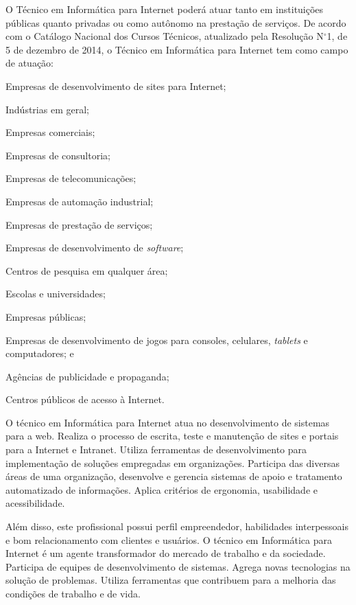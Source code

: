 \documentclass[
	12pt,				%
	openright,			%
	twoside,			%
	a4paper,			%
	chapter=TITLE,		%
	english,			%
	french,				%
	spanish,			%
	brazil,				%
	]{abntex2}
\begin{document}
O Técnico em Informática para Internet poderá atuar tanto em instituições públicas quanto privadas ou como autônomo na prestação de serviços. De acordo com o Catálogo Nacional dos Cursos Técnicos, atualizado pela Resolução N$^\circ$1, de 5 de dezembro de 2014, o Técnico em Informática para Internet tem como campo de atuação:
\begin{alineas}
    \item Empresas de desenvolvimento de sites para Internet;
    \item Indústrias em geral;
    \item Empresas comerciais;
    \item Empresas de consultoria;
    \item Empresas de telecomunicações;
    \item Empresas de automação industrial;
    \item Empresas de prestação de serviços;
    \item Empresas de desenvolvimento de \textit{software};
    \item Centros de pesquisa em qualquer área;
    \item Escolas e universidades;
    \item Empresas públicas;
    \item Empresas de desenvolvimento de jogos para consoles, celulares, \textit{tablets} e computadores; e
    \item Agências de publicidade e propaganda;
    \item Centros públicos de acesso à Internet.
\end{alineas}


O técnico em Informática para Internet atua no desenvolvimento de sistemas para a web. Realiza o processo de escrita, teste e manutenção de sites e portais para a Internet e Intranet. Utiliza ferramentas de desenvolvimento para implementação de soluções empregadas em organizações. Participa das diversas áreas de uma organização, desenvolve e gerencia sistemas de apoio e tratamento automatizado de informações. Aplica critérios de ergonomia, usabilidade e acessibilidade.

Além disso, este profissional possui perfil empreendedor, habilidades interpessoais e bom relacionamento com clientes e usuários. O técnico em Informática para Internet é um agente transformador do mercado de trabalho e da sociedade. Participa de equipes de desenvolvimento de sistemas. Agrega novas tecnologias na solução de problemas. Utiliza ferramentas que contribuem para a melhoria das condições de trabalho e de vida.
\end{document}

